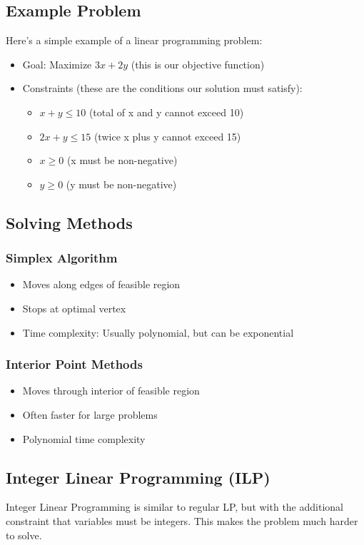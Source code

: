 \documentclass[11pt,a4paper]{article}
\begin{document}
\begin{multicols}{2}
\subsection{Example Problem}
Here's a simple example of a linear programming problem:
\begin{itemize}
    \item Goal: Maximize $3x + 2y$ (this is our objective function)
    \item Constraints (these are the conditions our solution must satisfy):
    \begin{itemize}
        \item $x + y \leq 10$ (total of x and y cannot exceed 10)
        \item $2x + y \leq 15$ (twice x plus y cannot exceed 15)
        \item $x \geq 0$ (x must be non-negative)
        \item $y \geq 0$ (y must be non-negative)
    \end{itemize}
\end{itemize}

\subsection{Solving Methods}
\subsubsection{Simplex Algorithm}
\begin{itemize}
    \item Moves along edges of feasible region
    \item Stops at optimal vertex
    \item Time complexity: Usually polynomial, but can be exponential
\end{itemize}

\subsubsection{Interior Point Methods}
\begin{itemize}
    \item Moves through interior of feasible region
    \item Often faster for large problems
    \item Polynomial time complexity
\end{itemize}

\subsection{Integer Linear Programming (ILP)}
Integer Linear Programming is similar to regular LP, but with the additional constraint that variables must be integers. This makes the problem much harder to solve.


\end{multicols}
\end{document}
